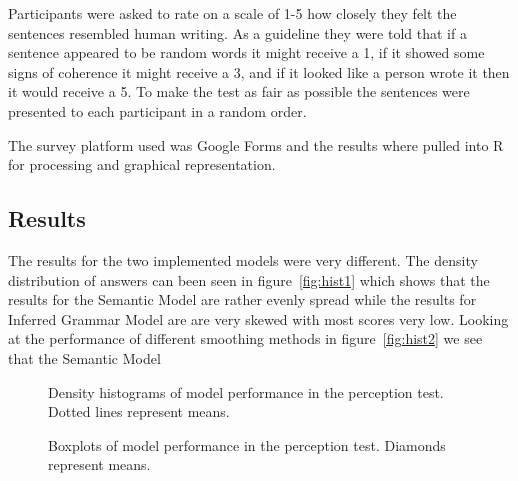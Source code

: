 \documentclass[ai15_group61_report.tex]{subfiles}
\begin{document}
Participants were asked to rate on a scale of 1-5 how closely they felt the sentences resembled human writing. As a guideline they were told that if a sentence appeared to be random words it might receive a 1, if it showed some signs of coherence it might receive a 3, and if it looked like a person wrote it then it would receive a 5. To make the test as fair as possible the sentences were presented to each participant in a random order. 

The survey platform used was Google Forms and the results where pulled into R for processing and graphical representation.

\subsection{Results}
\label{sec:results}
The results for the two implemented models were very different. The density distribution of answers can been seen in figure~\ref{fig:hist1} which shows that the results for the Semantic Model are rather evenly spread while the results for Inferred Grammar Model are are very skewed with most scores very low. Looking at the performance of different smoothing methods in figure~\ref{fig:hist2} we see that the Semantic Model  

\begin{figure}
  \centering
    \qquad
    \caption{Density histograms of model performance in the perception test. Dotted lines represent means.}%
    \label{fig:histograms}%
\end{figure}

\begin{figure}%
    \centering
    \qquad
    \qquad
    \caption{Boxplots of model performance in the perception test. Diamonds represent   means.}%
  \label{fig:boxplots}
\end{figure}
\end{document}

